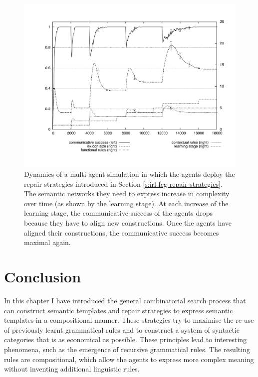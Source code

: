 \begin{figure}
  \begin{center}
    \includegraphics[width=.8\textwidth]{./composition/figures/learning-operators-graph.pdf}
    \caption[Resulting dynamics of repair strategies for predefined
    conceptualisations]{Dynamics of a multi-agent simulation in which
      the agents deploy the repair strategies introduced in Section
      \ref{s:irl-fcg-repair-strategies}. The semantic networks they
      need to express increase in complexity over time (as shown by
      the learning stage). At each increase of the learning stage, the
      communicative success of the agents drops because they have to
      align new constructions. Once the agents have aligned their
      constructions, the communicative success becomes maximal again.}
    \label{f:map-repair-strategies-graph}
  \end{center}
\end{figure}

\section{Conclusion}

In this chapter I have introduced the general combinatorial search
process that can construct semantic templates and repair strategies to
express semantic templates in a compositional manner. These strategies
try to maximise the re-use of previously learnt grammatical rules and
to construct a system of syntactic categories that is as economical as
possible. These principles lead to interesting phenomena, such as the
emergence of recursive grammatical rules. The resulting rules are
compositional, which allow the agents to express more complex meaning
without inventing additional linguistic rules.

\newpage
\thispagestyle{empty}